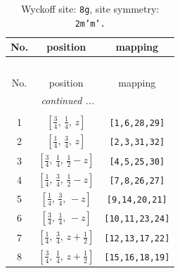\documentclass[fleqn,8pt]{jsarticle}
\begin{document}
\renewcommand{\arraystretch}{1.2}
\begin{longtable}{ccc}
\caption{Wyckoff site: {\tt 8g}, site symmetry: {\tt 2m'm'.}}
 \\
 \hline \hline
No. & position & mapping \\ \hline \endfirsthead

\multicolumn{2}{l}{\tablename\ \thetable{}} \\
 \hline \hline
No. & position & mapping \\ \hline \endhead

 \hline \hline
\multicolumn{2}{r}{\footnotesize\it continued ...} \\ \endfoot

 \hline \hline
\multicolumn{2}{r}{} \\ \endlastfoot

1 & $\left[ \frac{3}{4},\, \frac{1}{4},\, z \right]$ & {\tt [1,6,28,29]} \\ \hline
2 & $\left[ \frac{1}{4},\, \frac{3}{4},\, z \right]$ & {\tt [2,3,31,32]} \\ \hline
3 & $\left[ \frac{3}{4},\, \frac{1}{4},\, \frac{1}{2} - z \right]$ & {\tt [4,5,25,30]} \\ \hline
4 & $\left[ \frac{1}{4},\, \frac{3}{4},\, \frac{1}{2} - z \right]$ & {\tt [7,8,26,27]} \\ \hline
5 & $\left[ \frac{1}{4},\, \frac{3}{4},\, - z \right]$ & {\tt [9,14,20,21]} \\ \hline
6 & $\left[ \frac{3}{4},\, \frac{1}{4},\, - z \right]$ & {\tt [10,11,23,24]} \\ \hline
7 & $\left[ \frac{1}{4},\, \frac{3}{4},\, z + \frac{1}{2} \right]$ & {\tt [12,13,17,22]} \\ \hline
8 & $\left[ \frac{3}{4},\, \frac{1}{4},\, z + \frac{1}{2} \right]$ & {\tt [15,16,18,19]} \\
\end{longtable}
\renewcommand{\arraystretch}{1.2}
\end{document}
